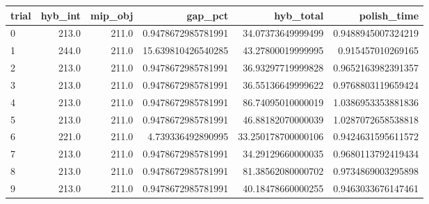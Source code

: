\begin{tabular}{lrrrrr}
\hline
trial & hyb_int & mip_obj & gap_pct & hyb_total & polish_time \\ \hline
0 & 213.0 & 211.0 & 0.9478672985781991 & 34.07373649999499 & 0.9488945007324219 \\
1 & 244.0 & 211.0 & 15.639810426540285 & 43.27800019999995 & 0.915457010269165 \\
2 & 213.0 & 211.0 & 0.9478672985781991 & 36.93297719999828 & 0.9652163982391357 \\
3 & 213.0 & 211.0 & 0.9478672985781991 & 36.55136649999622 & 0.9768803119659424 \\
4 & 213.0 & 211.0 & 0.9478672985781991 & 86.74095010000019 & 1.0386953353881836 \\
5 & 213.0 & 211.0 & 0.9478672985781991 & 46.88182070000039 & 1.0287072658538818 \\
6 & 221.0 & 211.0 & 4.739336492890995 & 33.250178700000106 & 0.9424631595611572 \\
7 & 213.0 & 211.0 & 0.9478672985781991 & 34.29129660000035 & 0.9680113792419434 \\
8 & 213.0 & 211.0 & 0.9478672985781991 & 81.38562080000702 & 0.9734869003295898 \\
9 & 213.0 & 211.0 & 0.9478672985781991 & 40.18478660000255 & 0.9463033676147461 \\
\hline
\end{tabular}
